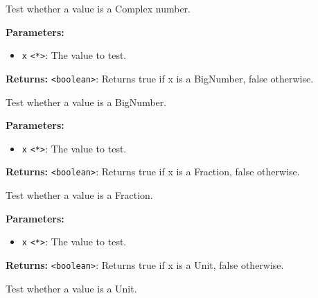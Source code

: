 \documentclass[12pt,a4paper]{article}
\begin{document}
\noindent Test whether a value is a Complex number.

\vspace{5mm}
\noindent {}


\noindent \textbf{Parameters:}
\begin{itemize}
  \item \texttt{x} \texttt{<*>}: The value to test.
\end{itemize}

\noindent \textbf{Returns:} \texttt{<boolean>}: Returns true if \textasciigrave{}x\textasciigrave{} is a BigNumber, false otherwise.

\noindent Test whether a value is a BigNumber.

\vspace{5mm}
\noindent {}


\noindent \textbf{Parameters:}
\begin{itemize}
  \item \texttt{x} \texttt{<*>}: The value to test.
\end{itemize}

\noindent \textbf{Returns:} \texttt{<boolean>}: Returns true if \textasciigrave{}x\textasciigrave{} is a Fraction, false otherwise.

\noindent Test whether a value is a Fraction.

\vspace{5mm}
\noindent {}


\noindent \textbf{Parameters:}
\begin{itemize}
  \item \texttt{x} \texttt{<*>}: The value to test.
\end{itemize}

\noindent \textbf{Returns:} \texttt{<boolean>}: Returns true if \textasciigrave{}x\textasciigrave{} is a Unit, false otherwise.

\noindent Test whether a value is a Unit.

\vspace{5mm}
\noindent {}
\end{document}
